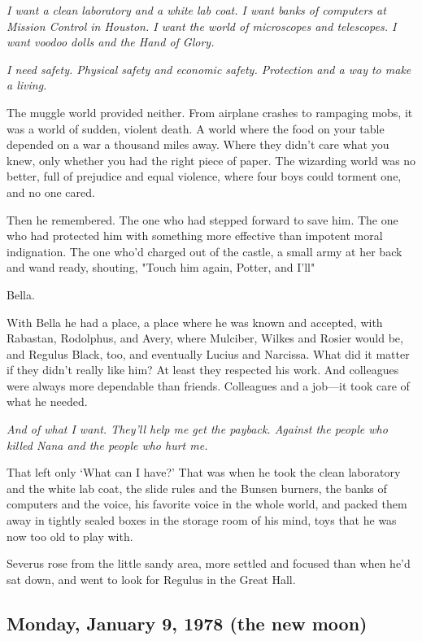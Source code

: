 \emph{I want a clean laboratory and a white lab coat. I want banks of computers at Mission Control in Houston. I want the world of microscopes and telescopes. I want voodoo dolls and the Hand of Glory.}

\emph{I need safety. Physical safety and economic safety. Protection and a way to make a living.}

The muggle world provided neither. From airplane crashes to rampaging mobs, it was a world of sudden, violent death. A world where the food on your table depended on a war a thousand miles away. Where they didn't care what you knew, only whether you had the right piece of paper. The wizarding world was no better, full of prejudice and equal violence, where four boys could torment one, and no one cared.

Then he remembered. The one who had stepped forward to save him. The one who had protected him with something more effective than impotent moral indignation. The one who'd charged out of the castle, a small army at her back and wand ready, shouting, "Touch him again, Potter, and I'll{\el}"

Bella.

With Bella he had a place, a place where he was known and accepted, with Rabastan, Rodolphus, and Avery, where Mulciber, Wilkes and Rosier would be, and Regulus Black, too, and eventually Lucius and Narcissa. What did it matter if they didn't really like him? At least they respected his work. And colleagues were always more dependable than friends. Colleagues and a job—it took care of what he needed.

\emph{And of what I want. They'll help me get the payback. Against the people who killed Nana and the people who hurt me.}

That left only `What can I have?' That was when he took the clean laboratory and the white lab coat, the slide rules and the Bunsen burners, the banks of computers and the voice, his favorite voice in the whole world, and packed them away in tightly sealed boxes in the storage room of his mind, toys that he was now too old to play with.

Severus rose from the little sandy area, more settled and focused than when he'd sat down, and went to look for Regulus in the Great Hall.


\subsection{Monday, January 9, 1978 (the new moon)}

